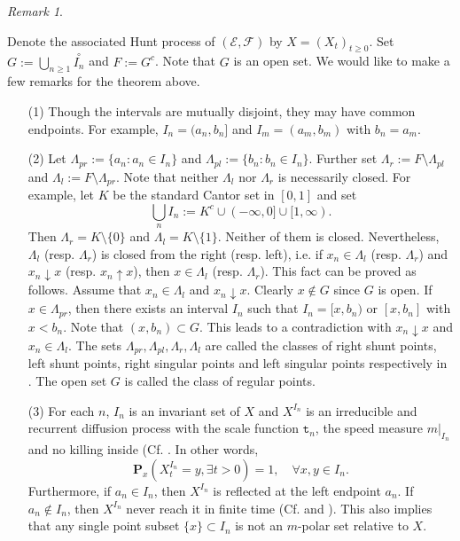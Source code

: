 \documentclass[a4paper]{amsart}
\theoremstyle{definition}
\theoremstyle{remark}
\newtheorem{remark}[theorem]{Remark}
\numberwithin{equation}{section}
\begin{document}
\begin{remark}\label{RM24}
{Denote the associated Hunt process of $({{\mathcal{E}}},{{\mathcal{F}}})$ by $X=(X_t)_{t\geq 0}$. Set
 $G:=\bigcup_{n\geq 1}\overset{\circ}{I_n}$ and $F:=G^c$. Note that $G$ is an open set.
We would like to make a few remarks for the theorem above.
\begin{itemize}
\item[(1)] Though the intervals are mutually disjoint, they may have common endpoints. For example, $I_n=(a_n, b_n]$ and $I_m=(a_m,b_m)$ with $b_n=a_m$.
\item[(2)] Let $\Lambda_{pr}:=\{a_n: a_n\in I_n\}$ and $\Lambda_{pl}:=\{b_n: b_n\in I_n\}$. Further set $\Lambda_r:=F\setminus \Lambda_{pl}$ and $\Lambda_l:=F\setminus \Lambda_{pr}$. Note that neither $\Lambda_l$ nor $\Lambda_r$ is necessarily closed. For example, let $K$ be the standard Cantor set in $[0,1]$ and set
\[
	\bigcup_nI_n := K^c \cup (-\infty, 0]\cup [1,\infty).
\]
Then $\Lambda_r=K\setminus \{0\}$ and $\Lambda_l=K\setminus \{1\}$. Neither of them is closed. Nevertheless, $\Lambda_l$ (resp. $\Lambda_r$) is closed from the right (resp. left), i.e. if $x_n\in \Lambda_l$ (resp. $\Lambda_r$) and $x_n\downarrow x$ (resp. $x_n\uparrow x$), then $x\in \Lambda_l$ (resp. $\Lambda_r$). This fact can be proved as follows. Assume that $x_n\in \Lambda_l$ and $x_n\downarrow x$. Clearly $x\notin G$ since $G$ is open. If $x\in \Lambda_{pr}$, then there exists an interval $I_n$ such that $I_n=[x, b_n)$ or $[x, b_n]$ with $x<b_n$. Note that $(x,b_n)\subset G$. This leads to a contradiction with $x_n\downarrow x$ and $x_n\in \Lambda_l$. The sets $\Lambda_{pr}, \Lambda_{pl}, \Lambda_r, \Lambda_l$ are called the classes of right shunt points, left shunt points, right singular points and left singular points respectively in \cite[\S3.4]{IM74}. The open set $G$ is called the class of regular points.
\item[(3)] For each $n$, $I_n$ is an invariant set of $X$ and $X^{I_n}$ is an irreducible and recurrent diffusion process with the scale function ${{\mathtt{t}}}_n$, the speed measure $m|_{I_n}$ and no killing inside (Cf. \cite[Theorem~2.2.11]{CF12}. In other words,
\[
	\mathbf{P}_x(X^{I_n}_t=y, \exists t>0)=1,\quad \forall x,y \in I_n.
\]
Furthermore, if $a_n\in I_n$, then $X^{I_n}$ is reflected at the left endpoint $a_n$. If $a_n\notin I_n$, then $X^{I_n}$ never reach it in finite time (Cf. \cite{I57} and \cite[Example~3.5.7]{CF12}). This also implies that any single point subset $\{x\}\subset I_n$ is not an $m$-polar set relative to $X$.

\end{itemize}}
\end{remark}
\end{document}
